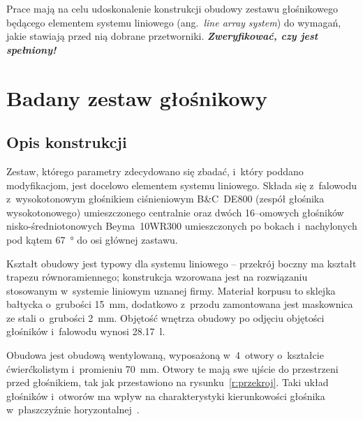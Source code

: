 \documentclass[12pt]{oska}
\newcommand{\comment}[1]{{\color{magenta}\emph{\textbf{#1}}}}
\begin{document}
		Prace mają na celu udoskonalenie konstrukcji obudowy zestawu głośnikowego będącego elementem systemu liniowego (ang.~\textit{line array system}) do wymagań, jakie stawiają przed nią dobrane przetworniki. \comment{Zweryfikować, czy jest spełniony!}
		

\section{Badany zestaw głośnikowy}

	\subsection{Opis konstrukcji}\label{ss:opis}
	
		Zestaw, którego parametry zdecydowano się zbadać, i~który poddano modyfikacjom, jest docelowo elementem systemu liniowego. Składa się z~falowodu z~wysokotonowym głośnikiem ciśnieniowym B\&C~DE800 (zespół głośnika wysokotonowego) umieszczonego centralnie oraz dwóch 16--omowych głośników nisko-średniotonowych Beyma~10WR300 umieszczonych po bokach i~nachylonych pod kątem \SI{67}{\degree} do osi głównej zastawu.
		
		Kształt obudowy jest typowy dla systemu liniowego -- przekrój boczny ma kształt trapezu równoramiennego; konstrukcja wzorowana jest na rozwiązaniu stosowanym w~systemie liniowym uznanej firmy. Materiał korpusu to sklejka bałtycka o~grubości \SI{15}{\milli\metre}, dodatkowo z~przodu zamontowana jest maskownica ze stali o~grubości \SI{2}{\milli\metre}. Objętość wnętrza obudowy po odjęciu objętości głośników i~falowodu wynosi \SI{28,17}{\litre}.
		
		Obudowa jest obudową wentylowaną, wyposażoną w~4~otwory o~kształcie ćwierćkolistym i~promieniu \SI{70}{\milli\metre}. Otwory te mają swe ujście do przestrzeni przed głośnikiem, tak jak przestawiono na rysunku~\ref{r:przekroj}. %
		Taki układ głośników i~otworów ma wpływ na charakterystyki kierunkowości głośnika w~płaszczyźnie horyzontalnej~\cite{kmiecik_inz}. %
		
\end{document}
